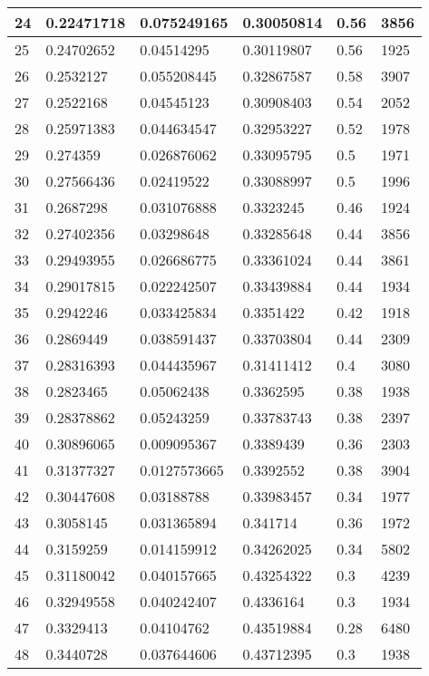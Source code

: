 \begin{longtable}{|l|l|l|l|l|l|}
24 & 0.22471718 & 0.075249165 & 0.30050814 & 0.56 & 3856 \\ \hline 
25 & 0.24702652 & 0.04514295 & 0.30119807 & 0.56 & 1925 \\ \hline 
26 & 0.2532127 & 0.055208445 & 0.32867587 & 0.58 & 3907 \\ \hline 
27 & 0.2522168 & 0.04545123 & 0.30908403 & 0.54 & 2052 \\ \hline 
28 & 0.25971383 & 0.044634547 & 0.32953227 & 0.52 & 1978 \\ \hline 
29 & 0.274359 & 0.026876062 & 0.33095795 & 0.5 & 1971 \\ \hline 
30 & 0.27566436 & 0.02419522 & 0.33088997 & 0.5 & 1996 \\ \hline 
31 & 0.2687298 & 0.031076888 & 0.3323245 & 0.46 & 1924 \\ \hline 
32 & 0.27402356 & 0.03298648 & 0.33285648 & 0.44 & 3856 \\ \hline 
33 & 0.29493955 & 0.026686775 & 0.33361024 & 0.44 & 3861 \\ \hline 
34 & 0.29017815 & 0.022242507 & 0.33439884 & 0.44 & 1934 \\ \hline 
35 & 0.2942246 & 0.033425834 & 0.3351422 & 0.42 & 1918 \\ \hline 
36 & 0.2869449 & 0.038591437 & 0.33703804 & 0.44 & 2309 \\ \hline 
37 & 0.28316393 & 0.044435967 & 0.31411412 & 0.4 & 3080 \\ \hline 
38 & 0.2823465 & 0.05062438 & 0.3362595 & 0.38 & 1938 \\ \hline 
39 & 0.28378862 & 0.05243259 & 0.33783743 & 0.38 & 2397 \\ \hline 
40 & 0.30896065 & 0.009095367 & 0.3389439 & 0.36 & 2303 \\ \hline 
41 & 0.31377327 & 0.0127573665 & 0.3392552 & 0.38 & 3904 \\ \hline 
42 & 0.30447608 & 0.03188788 & 0.33983457 & 0.34 & 1977 \\ \hline 
43 & 0.3058145 & 0.031365894 & 0.341714 & 0.36 & 1972 \\ \hline 
44 & 0.3159259 & 0.014159912 & 0.34262025 & 0.34 & 5802 \\ \hline 
45 & 0.31180042 & 0.040157665 & 0.43254322 & 0.3 & 4239 \\ \hline 
46 & 0.32949558 & 0.040242407 & 0.4336164 & 0.3 & 1934 \\ \hline 
47 & 0.3329413 & 0.04104762 & 0.43519884 & 0.28 & 6480 \\ \hline 
48 & 0.3440728 & 0.037644606 & 0.43712395 & 0.3 & 1938 \\ \hline 

\end{longtable}
